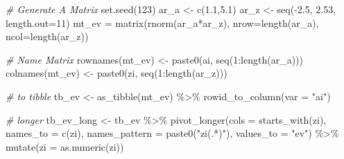 \documentclass[
]{book}
\newenvironment{Shaded}{\begin{snugshade}}{\end{snugshade}}
\newcommand{\AttributeTok}[1]{\textcolor[rgb]{0.77,0.63,0.00}{#1}}
\newcommand{\CommentTok}[1]{\textcolor[rgb]{0.56,0.35,0.01}{\textit{#1}}}
\newcommand{\DecValTok}[1]{\textcolor[rgb]{0.00,0.00,0.81}{#1}}
\newcommand{\FloatTok}[1]{\textcolor[rgb]{0.00,0.00,0.81}{#1}}
\newcommand{\FunctionTok}[1]{\textcolor[rgb]{0.00,0.00,0.00}{#1}}
\newcommand{\NormalTok}[1]{#1}
\newcommand{\OtherTok}[1]{\textcolor[rgb]{0.56,0.35,0.01}{#1}}
\newcommand{\SpecialCharTok}[1]{\textcolor[rgb]{0.00,0.00,0.00}{#1}}
\newcommand{\StringTok}[1]{\textcolor[rgb]{0.31,0.60,0.02}{#1}}
\begin{document}
\begin{Shaded}
\begin{Highlighting}[]
\CommentTok{\# Generate A Matrix}
\FunctionTok{set.seed}\NormalTok{(}\DecValTok{123}\NormalTok{)}
\NormalTok{ar\_a }\OtherTok{\textless{}{-}} \FunctionTok{c}\NormalTok{(}\FloatTok{1.1}\NormalTok{,}\FloatTok{5.1}\NormalTok{)}
\NormalTok{ar\_z }\OtherTok{\textless{}{-}} \FunctionTok{seq}\NormalTok{(}\SpecialCharTok{{-}}\FloatTok{2.5}\NormalTok{, }\FloatTok{2.53}\NormalTok{, }\AttributeTok{length.out=}\DecValTok{11}\NormalTok{)}
\NormalTok{mt\_ev }\OtherTok{=} \FunctionTok{matrix}\NormalTok{(}\FunctionTok{rnorm}\NormalTok{(ar\_a}\SpecialCharTok{*}\NormalTok{ar\_z), }\AttributeTok{nrow=}\FunctionTok{length}\NormalTok{(ar\_a), }\AttributeTok{ncol=}\FunctionTok{length}\NormalTok{(ar\_z))}

\CommentTok{\# Name Matrix}
\FunctionTok{rownames}\NormalTok{(mt\_ev) }\OtherTok{\textless{}{-}} \FunctionTok{paste0}\NormalTok{(}\StringTok{\textquotesingle{}ai\textquotesingle{}}\NormalTok{, }\FunctionTok{seq}\NormalTok{(}\DecValTok{1}\SpecialCharTok{:}\FunctionTok{length}\NormalTok{(ar\_a)))}
\FunctionTok{colnames}\NormalTok{(mt\_ev) }\OtherTok{\textless{}{-}} \FunctionTok{paste0}\NormalTok{(}\StringTok{\textquotesingle{}zi\textquotesingle{}}\NormalTok{, }\FunctionTok{seq}\NormalTok{(}\DecValTok{1}\SpecialCharTok{:}\FunctionTok{length}\NormalTok{(ar\_z)))}

\CommentTok{\# to tibble}
\NormalTok{tb\_ev }\OtherTok{\textless{}{-}} \FunctionTok{as\_tibble}\NormalTok{(mt\_ev) }\SpecialCharTok{\%\textgreater{}\%} \FunctionTok{rowid\_to\_column}\NormalTok{(}\AttributeTok{var =} \StringTok{"ai"}\NormalTok{)}

\CommentTok{\# longer}
\NormalTok{tb\_ev\_long }\OtherTok{\textless{}{-}}\NormalTok{ tb\_ev }\SpecialCharTok{\%\textgreater{}\%}
  \FunctionTok{pivot\_longer}\NormalTok{(}\AttributeTok{cols =} \FunctionTok{starts\_with}\NormalTok{(}\StringTok{\textquotesingle{}zi\textquotesingle{}}\NormalTok{),}
               \AttributeTok{names\_to =} \FunctionTok{c}\NormalTok{(}\StringTok{\textquotesingle{}zi\textquotesingle{}}\NormalTok{),}
               \AttributeTok{names\_pattern =} \FunctionTok{paste0}\NormalTok{(}\StringTok{"zi(.*)"}\NormalTok{),}
               \AttributeTok{values\_to =} \StringTok{"ev"}\NormalTok{) }\SpecialCharTok{\%\textgreater{}\%}
  \FunctionTok{mutate}\NormalTok{(}\AttributeTok{zi =} \FunctionTok{as.numeric}\NormalTok{(zi))}


\end{Highlighting}
\end{Shaded}
\end{document}
